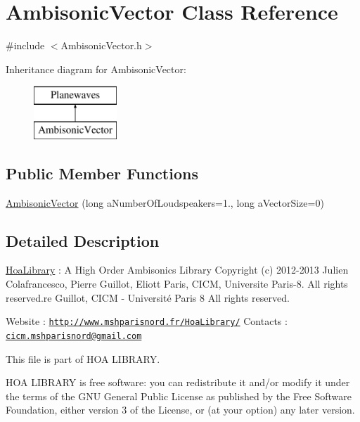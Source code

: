 \hypertarget{class_ambisonic_vector}{\section{Ambisonic\-Vector Class Reference}
\label{class_ambisonic_vector}
}


{\ttfamily \#include $<$Ambisonic\-Vector.\-h$>$}

Inheritance diagram for Ambisonic\-Vector\-:\begin{figure}[H]
\begin{center}
\leavevmode
\includegraphics[height=2.000000cm]{class_ambisonic_vector}
\end{center}
\end{figure}
\subsection*{Public Member Functions}
\begin{DoxyCompactItemize}
\item 
\hyperlink{class_ambisonic_vector_ae4c02b111015ca551b50676e9989e5e1}{Ambisonic\-Vector} (long a\-Number\-Of\-Loudspeakers=1., long a\-Vector\-Size=0)
\end{DoxyCompactItemize}


\subsection{Detailed Description}
\hyperlink{interface_hoa_library}{Hoa\-Library} \-: A High Order Ambisonics Library Copyright (c) 2012-\/2013 Julien Colafrancesco, Pierre Guillot, Eliott Paris, C\-I\-C\-M, Universite Paris-\/8. All rights reserved.\-re Guillot, C\-I\-C\-M -\/ Université Paris 8 All rights reserved.

Website \-: \href{http://www.mshparisnord.fr/HoaLibrary/}{\tt http\-://www.\-mshparisnord.\-fr/\-Hoa\-Library/} Contacts \-: \href{mailto:cicm.mshparisnord@gmail.com}{\tt cicm.\-mshparisnord@gmail.\-com}

This file is part of H\-O\-A L\-I\-B\-R\-A\-R\-Y.

H\-O\-A L\-I\-B\-R\-A\-R\-Y is free software\-: you can redistribute it and/or modify it under the terms of the G\-N\-U General Public License as published by the Free Software Foundation, either version 3 of the License, or (at your option) any later version.

